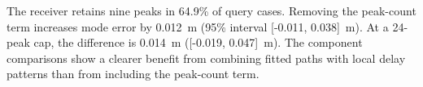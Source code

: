 The receiver retains nine peaks in 64.9\% of query cases. Removing the peak-count term increases mode error by 0.012~m (95\% interval [-0.011, 0.038]~m). At a 24-peak cap, the difference is 0.014~m ([-0.019, 0.047]~m). The component comparisons show a clearer benefit from combining fitted paths with local delay patterns than from including the peak-count term.
